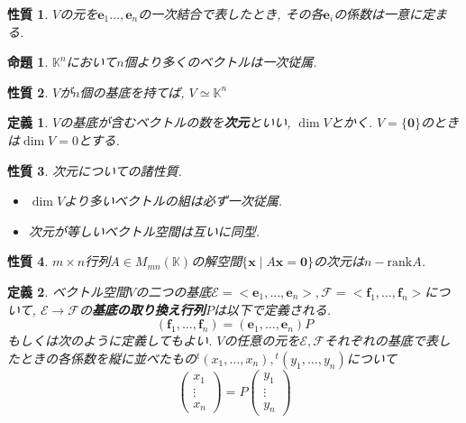 \documentclass[a4j,dvipdfmx]{jsarticle}
\newcommand{\K}{\mathbb{K}}
\newcommand{\rank}{\mathrm{rank}}
\newcommand{\E}{\mathcal{E}}
\newcommand{\F}{\mathcal{F}}
\newcommand{\trans}{{}^t}
\theoremstyle{mystyle}
\newtheorem*{definition}{定義}
\newtheorem{proposition}[theorem]{命題}
\newtheorem*{property}{性質}
\begin{document}
    \begin{property}
        $V$の元を$\bm{e}_1\dots,\bm{e}_n$の一次結合で表したとき, その各$\bm{e}_i$の係数は一意に定まる.
    \end{property}
    \begin{proposition}
        $\K^n$において$n$個より多くのベクトルは一次従属.
    \end{proposition}
    \begin{property}
        $V$が$n$個の基底を持てば, $V\simeq\K^n$
    \end{property}
    \begin{definition}
        $V$の基底が含むベクトルの数を\textbf{次元}といい, $\dim V$とかく. $V=\{\bm{0}\}$のときは$\dim V=0$とする.
    \end{definition}
    \begin{property}
        次元についての諸性質.
        \begin{itemize}
            \item $\dim V$より多いベクトルの組は必ず一次従属.
            \item 次元が等しいベクトル空間は互いに同型.
        \end{itemize}
    \end{property}
    \begin{property}
        $m\times n$行列$A\in M_{mn}(\K)$の解空間$\{\bm{x}\mid A\bm{x}=\bm{0}\}$の次元は$n-\rank A$.
    \end{property}
    \begin{definition}
        ベクトル空間$V$の二つの基底$\E=<\bm{e}_1,\dots,\bm{e}_n>,\F=<\bm{f}_1,\dots,\bm{f}_n>$について, $\E\to\F$の\textbf{基底の取り換え行列}$P$は以下で定義される.
        \begin{equation*}
            (\bm{f}_1,\dots,\bm{f}_n)=(\bm{e}_1,\dots,\bm{e}_n)P
        \end{equation*}
        もしくは次のように定義してもよい. $V$の任意の元を$\E,\F$それぞれの基底で表したときの各係数を縦に並べたもの$\trans(x_1,\dots,x_n),\trans(y_1,\dots,y_n)$について
        \begin{equation*}
            \begin{pmatrix}
                x_1\\\vdots\\x_n
            \end{pmatrix}
            = P
            \begin{pmatrix}
                y_1\\\vdots\\y_n
            \end{pmatrix}
        \end{equation*}
    \end{definition}
\end{document}
